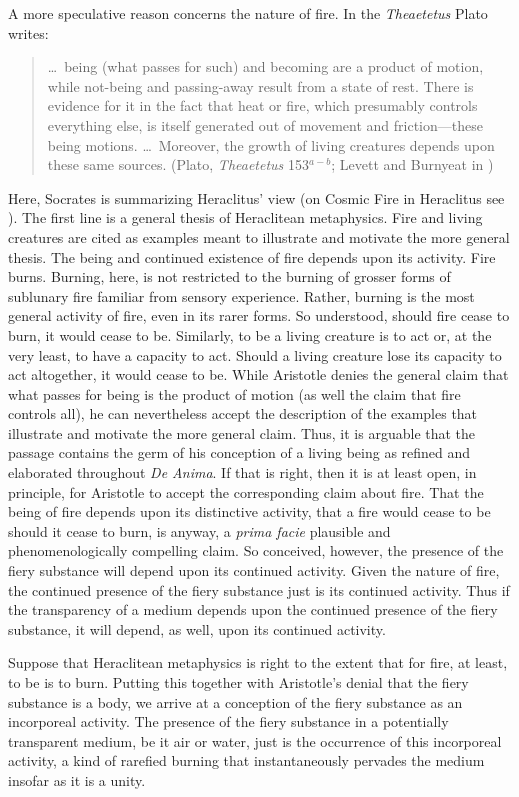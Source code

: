 A more speculative reason concerns the nature of fire. In the \emph{Theaetetus} Plato writes:
\begin{quote}
	\ldots\ being (what passes for such) and becoming are a product of motion, while not-being and passing-away result from a state of rest. There is evidence for it in the fact that heat or fire, which presumably controls everything else, is itself generated out of movement and friction---these being motions. \ldots\ Moreover, the growth of living creatures depends upon these same sources. (Plato, \emph{Theaetetus} 153\( ^{a-b} \); Levett and Burnyeat in \citealt[70]{Cooper:1997fk})
\end{quote}
Here, Socrates is summarizing Heraclitus' view (on Cosmic Fire in Heraclitus see \citealt{Wiggins:1982kx}). The first line is a general thesis of Heraclitean metaphysics. Fire and living creatures are cited as examples meant to illustrate and motivate the more general thesis. The being and continued existence of fire depends upon its activity. Fire burns. Burning, here, is not restricted to the burning of grosser forms of sublunary fire familiar from sensory experience. Rather, burning is the most general activity of fire, even in its rarer forms. So understood, should fire cease to burn, it would cease to be. Similarly, to be a living creature is to act or, at the very least, to have a capacity to act. Should a living creature lose its capacity to act altogether, it would cease to be. While Aristotle denies the general claim that what passes for being is the product of motion (as well the claim that fire controls all), he can nevertheless accept the description of the examples that illustrate and motivate the more general claim. Thus, it is arguable that the passage contains the germ of his conception of a living being as refined and elaborated throughout \emph{De Anima}. If that is right, then it is at least open, in principle, for Aristotle to accept the corresponding claim about fire. That the being of fire depends upon its distinctive activity, that a fire would cease to be should it cease to burn, is anyway, a \emph{prima facie} plausible and phenomenologically compelling claim. So conceived, however, the presence of the fiery substance will depend upon its continued activity. Given the nature of fire, the continued presence of the fiery substance just is its continued activity. Thus if the transparency of a medium depends upon the continued presence of the fiery substance, it will depend, as well, upon its continued activity. 

Suppose that Heraclitean metaphysics is right to the extent that for fire, at least, to be is to burn. Putting this together with Aristotle's denial that the fiery substance is a body, we arrive at a conception of the fiery substance as an incorporeal activity. The presence of the fiery substance in a potentially transparent medium, be it air or water, just is the occurrence of this incorporeal activity, a kind of rarefied burning that instantaneously pervades the medium insofar as it is a unity.

